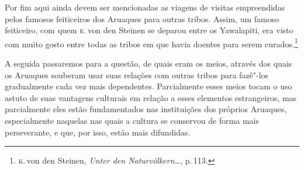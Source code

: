 Por fim aqui ainda devem ser mencionadas as viagens de visitas
empreendidas pelos famosos feiticeiros dos Aruaques para outras tribos.
Assim, um famoso feiticeiro, com quem \textsc{k}.\,von den Steinen se deparou
entre os Yawalapiti, era visto com muito gosto entre todas as tribos em
que havia doentes para serem curados.\footnote{\textsc{k}.\,von den Steinen,
  \textit{Unter den Naturvölkern\ldots}, p.\,113.}


A seguida passaremos para a questão, de quais eram os meios, através dos
quais os Aruaques souberam usar suas relações com outras tribos para
fazê"-los gradualmente cada vez mais dependentes. Parcialmente esses
meios tocam o uso astuto de suas vantagens culturais em relação a esses
elementos estrangeiros, mas parcialmente eles estão fundamentados nas
instituições dos próprios Aruaques, especialmente naquelas nas quais a
cultura se conservou de forma mais perseverante, e que, por isso, estão
mais difundidas.

